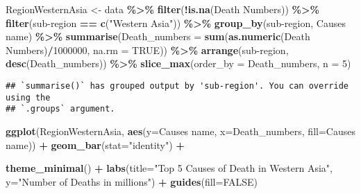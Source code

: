 \documentclass[
]{article}
\newenvironment{Shaded}{\begin{snugshade}}{\end{snugshade}}
\newcommand{\AttributeTok}[1]{\textcolor[rgb]{0.13,0.29,0.53}{#1}}
\newcommand{\ConstantTok}[1]{\textcolor[rgb]{0.56,0.35,0.01}{#1}}
\newcommand{\DecValTok}[1]{\textcolor[rgb]{0.00,0.00,0.81}{#1}}
\newcommand{\FunctionTok}[1]{\textcolor[rgb]{0.13,0.29,0.53}{\textbf{#1}}}
\newcommand{\NormalTok}[1]{#1}
\newcommand{\OtherTok}[1]{\textcolor[rgb]{0.56,0.35,0.01}{#1}}
\newcommand{\SpecialCharTok}[1]{\textcolor[rgb]{0.81,0.36,0.00}{\textbf{#1}}}
\newcommand{\StringTok}[1]{\textcolor[rgb]{0.31,0.60,0.02}{#1}}
\begin{document}
\begin{Shaded}
\begin{Highlighting}[]
\NormalTok{RegionWesternAsia }\OtherTok{\textless{}{-}}\NormalTok{ data }\SpecialCharTok{\%\textgreater{}\%}
  \FunctionTok{filter}\NormalTok{(}\SpecialCharTok{!}\FunctionTok{is.na}\NormalTok{(}\StringTok{\textasciigrave{}}\AttributeTok{Death Numbers}\StringTok{\textasciigrave{}}\NormalTok{)) }\SpecialCharTok{\%\textgreater{}\%}
  \FunctionTok{filter}\NormalTok{(}\StringTok{\textasciigrave{}}\AttributeTok{sub{-}region}\StringTok{\textasciigrave{}} \SpecialCharTok{==} \FunctionTok{c}\NormalTok{(}\StringTok{"Western Asia"}\NormalTok{)) }\SpecialCharTok{\%\textgreater{}\%}
  \FunctionTok{group\_by}\NormalTok{(}\StringTok{\textasciigrave{}}\AttributeTok{sub{-}region}\StringTok{\textasciigrave{}}\NormalTok{, }\StringTok{\textasciigrave{}}\AttributeTok{Causes name}\StringTok{\textasciigrave{}}\NormalTok{) }\SpecialCharTok{\%\textgreater{}\%}
  \FunctionTok{summarise}\NormalTok{(}\AttributeTok{Death\_numbers =} \FunctionTok{sum}\NormalTok{(}\FunctionTok{as.numeric}\NormalTok{(}\StringTok{\textasciigrave{}}\AttributeTok{Death Numbers}\StringTok{\textasciigrave{}}\NormalTok{)}\SpecialCharTok{/}\DecValTok{1000000}\NormalTok{, }\AttributeTok{na.rm =} \ConstantTok{TRUE}\NormalTok{)) }\SpecialCharTok{\%\textgreater{}\%}
  \FunctionTok{arrange}\NormalTok{(}\StringTok{\textasciigrave{}}\AttributeTok{sub{-}region}\StringTok{\textasciigrave{}}\NormalTok{, }\FunctionTok{desc}\NormalTok{(Death\_numbers)) }\SpecialCharTok{\%\textgreater{}\%}
  \FunctionTok{slice\_max}\NormalTok{(}\AttributeTok{order\_by =}\NormalTok{ Death\_numbers, }\AttributeTok{n =} \DecValTok{5}\NormalTok{)}
\end{Highlighting}
\end{Shaded}

\begin{verbatim}
## `summarise()` has grouped output by 'sub-region'. You can override using the
## `.groups` argument.
\end{verbatim}

\begin{Shaded}
\begin{Highlighting}[]
\FunctionTok{ggplot}\NormalTok{(RegionWesternAsia, }\FunctionTok{aes}\NormalTok{(}\AttributeTok{y=}\StringTok{\textasciigrave{}}\AttributeTok{Causes name}\StringTok{\textasciigrave{}}\NormalTok{, }\AttributeTok{x=}\NormalTok{Death\_numbers, }\AttributeTok{fill=}\StringTok{\textasciigrave{}}\AttributeTok{Causes name}\StringTok{\textasciigrave{}}\NormalTok{)) }\SpecialCharTok{+}
  \FunctionTok{geom\_bar}\NormalTok{(}\AttributeTok{stat=}\StringTok{"identity"}\NormalTok{) }\SpecialCharTok{+}
 
  \FunctionTok{theme\_minimal}\NormalTok{() }\SpecialCharTok{+} 
  \FunctionTok{labs}\NormalTok{(}\AttributeTok{title=}\StringTok{"Top 5 Causes of Death in Western Asia"}\NormalTok{,}
       \AttributeTok{y=}\StringTok{"Number of Deaths in millions"}\NormalTok{) }\SpecialCharTok{+}
  \FunctionTok{guides}\NormalTok{(}\AttributeTok{fill=}\ConstantTok{FALSE}\NormalTok{)}
\end{Highlighting}
\end{Shaded}
\end{document}
